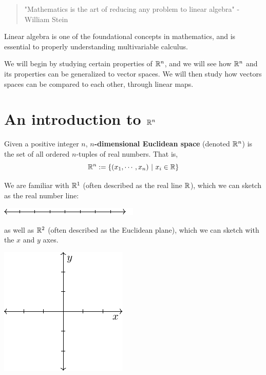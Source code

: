 
\begin{quote}
    "Mathematics is the art of reducing any problem to linear algebra" - William Stein
\end{quote}


Linear algebra is one of the foundational concepts in mathematics, and is essential to properly understanding multivariable calculus.

We will begin by studying certain properties of $\mathbb{R}^n$, and we will see how $\mathbb{R}^n$ and its properties can be generalized to vector spaces.  We will then study how vectors spaces can be compared to each other, through linear maps.


\section{An introduction to $\mathbb{R}^n$}

\begin{definition}
Given a positive integer $n$, \textbf{$n$-dimensional Euclidean space} (denoted $\mathbb{R}^n$) is the set of all ordered $n$-tuples of real numbers.  That is,
$$\mathbb{R}^n := \{(x_1, \cdots ,x_n) \ | \ x_i \in \mathbb{R}\}$$
\end{definition}

\begin{example}
    We are familiar with $\mathbb{R}^1$ (often described as the real line $\mathbb{R}$), which we can sketch as the real number line:
    \begin{center}        
        \includegraphics{chapters/1-LinearAlgebra/figures/figures-r1.pdf}
    \end{center}
    
    as well as $\mathbb{R}^2$ (often described as the Euclidean plane), which we can sketch with the $x$ and $y$ axes.
    
        \begin{center}        
        \includegraphics{chapters/1-LinearAlgebra/figures/figures-r2.pdf}
    \end{center}
    
\end{example}

